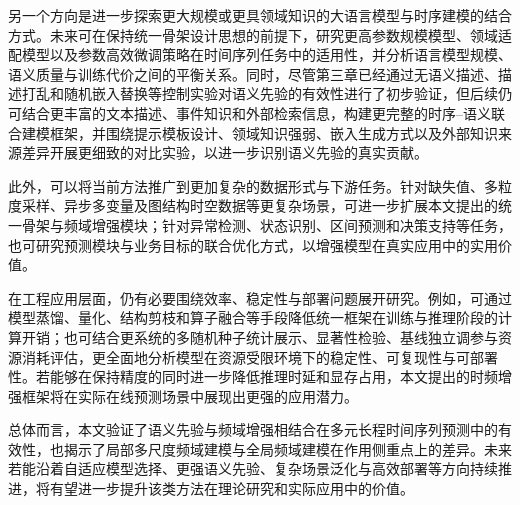 另一个方向是进一步探索更大规模或更具领域知识的大语言模型与时序建模的结合方式。未来可在保持统一骨架设计思想的前提下，研究更高参数规模模型、领域适配模型以及参数高效微调策略在时间序列任务中的适用性，并分析语言模型规模、语义质量与训练代价之间的平衡关系。同时，尽管第三章已经通过无语义描述、描述打乱和随机嵌入替换等控制实验对语义先验的有效性进行了初步验证，但后续仍可结合更丰富的文本描述、事件知识和外部检索信息，构建更完整的时序--语义联合建模框架，并围绕提示模板设计、领域知识强弱、嵌入生成方式以及外部知识来源差异开展更细致的对比实验，以进一步识别语义先验的真实贡献。

此外，可以将当前方法推广到更加复杂的数据形式与下游任务。针对缺失值、多粒度采样、异步多变量及图结构时空数据等更复杂场景，可进一步扩展本文提出的统一骨架与频域增强模块；针对异常检测、状态识别、区间预测和决策支持等任务，也可研究预测模块与业务目标的联合优化方式，以增强模型在真实应用中的实用价值。

在工程应用层面，仍有必要围绕效率、稳定性与部署问题展开研究。例如，可通过模型蒸馏、量化、结构剪枝和算子融合等手段降低统一框架在训练与推理阶段的计算开销；也可结合更系统的多随机种子统计展示、显著性检验、基线独立调参与资源消耗评估，更全面地分析模型在资源受限环境下的稳定性、可复现性与可部署性。若能够在保持精度的同时进一步降低推理时延和显存占用，本文提出的时频增强框架将在实际在线预测场景中展现出更强的应用潜力。

总体而言，本文验证了语义先验与频域增强相结合在多元长程时间序列预测中的有效性，也揭示了局部多尺度频域建模与全局频域建模在作用侧重点上的差异。未来若能沿着自适应模型选择、更强语义先验、复杂场景泛化与高效部署等方向持续推进，将有望进一步提升该类方法在理论研究和实际应用中的价值。






